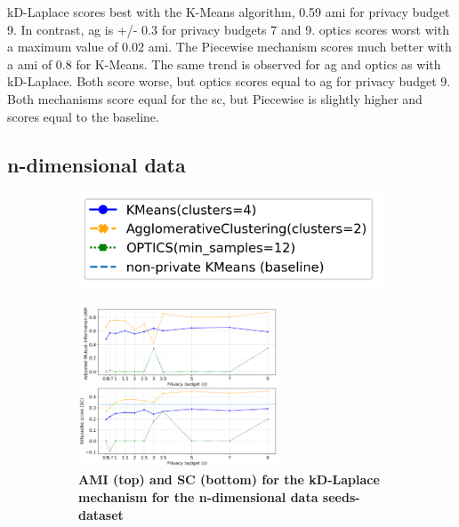 kD-Laplace scores best with the K-Means algorithm, 0.59 \gls{ami} for privacy budget 9.
In contrast, \gls{ag} is +/- 0.3 for privacy budgets 7 and 9. \gls{optics} scores worst with a maximum value of 0.02 \gls{ami}.
The Piecewise mechanism scores much better with a \gls{ami} of 0.8 for K-Means. The same trend is observed for \gls{ag} and \gls{optics} as with kD-Laplace.
Both score worse, but \gls{optics} scores equal to \gls{ag} for privacy budget 9.
Both mechanisms score equal for the \gls{sc}, but Piecewise is slightly higher and scores equal to the baseline.
\newpage
\subsection{n-dimensional data}
\begin{figure}[H]
  \centering
  \begin{subfigure}{0.30\textwidth}
    \includegraphics[width=\textwidth]{Results/kd-laplace/kd-Laplace/seeds-dataset/legend_7.png}
  \end{subfigure}
  \begin{subfigure}{1\textwidth}
    \caption{\textbf{AMI (top) and SC (bottom) for the kD-Laplace mechanism for the n-dimensional data seeds-dataset}}
    \centering
    \includegraphics[width=0.65\textwidth]{Results/kd-laplace/kd-Laplace/seeds-dataset/ami-and-sc_7_dimensions.png}
    \centering
  \end{subfigure}
  \begin{subfigure}{1\textwidth}

\end{subfigure}
\end{figure}
